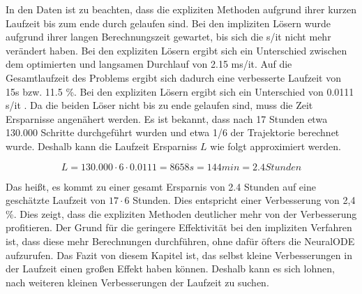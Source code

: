 In den Daten ist zu beachten, dass die expliziten Methoden aufgrund ihrer kurzen Laufzeit bis zum ende durch gelaufen sind.
Bei den impliziten Lösern wurde aufgrund ihrer langen Berechnungszeit gewartet, bis sich die s/it nicht mehr verändert haben.
Bei den expliziten Lösern ergibt sich ein Unterschied zwischen dem optimierten und langsamen Durchlauf von 2.15 ms/it.
Auf die Gesamtlaufzeit des Problems ergibt sich dadurch eine verbesserte Laufzeit von 15s bzw. 11.5 \%.
Bei den expliziten Lösern ergibt sich ein Unterschied von 0.0111 s/it .
Da die beiden Löser nicht bis zu ende gelaufen sind, muss die Zeit Ersparnisse angenähert werden.
Es ist bekannt, dass nach 17 Stunden etwa 130.000 Schritte durchgeführt wurden und etwa 1/6 der Trajektorie berechnet wurde.
Deshalb kann die Laufzeit Ersparniss $L$ wie folgt approximiert werden.

$$
L = 130.000 \cdot 6 \cdot 0.0111 = 8658s = 144 min = 2.4 Stunden 
$$

Das heißt, es kommt zu einer gesamt Ersparnis von 2.4 Stunden auf eine geschätzte Laufzeit von $17 \cdot 6 $ Stunden.
Dies entspricht einer Verbesserung von 2,4 \%.
Dies zeigt, dass die expliziten Methoden deutlicher mehr von der Verbesserung profitieren.
Der Grund für die geringere Effektivität bei den impliziten Verfahren ist, dass diese mehr Berechnungen durchführen, ohne dafür öfters 
die NeuralODE aufzurufen.
Das Fazit von diesem Kapitel ist, das selbst kleine Verbesserungen in der Laufzeit einen großen Effekt haben können.
Deshalb kann es sich lohnen, nach weiteren kleinen Verbesserungen der Laufzeit zu suchen.



